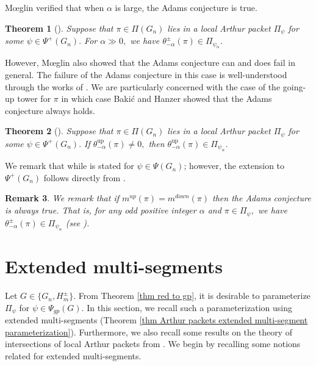 \documentclass[11pt,letterpaper]{amsart}
\newcommand{\up}{{\mathrm{up}}}
\newtheorem{thm}{Theorem}[section]
\newtheorem{rmk}[thm]{Remark}
\numberwithin{equation}{section}
\begin{document}
M{\oe}glin verified that when $\alpha$ is large, the Adams conjecture is true.
\begin{thm}[{\cite[Theorem 6.1]{Moe11c}}]\label{thm Moeglin Adams}
Suppose that $\pi\in\Pi(G_n)$ lies in a local Arthur packet $\Pi_\psi$ for some $\psi\in\Psi^+(G_n).$
    For $\alpha\gg 0,$ we have $\theta_{-\alpha}^\pm(\pi)\in\Pi_{\psi_\alpha}$.
\end{thm}
However, M{\oe}glin also showed that the Adams conjecture can and does fail in general. The failure of the Adams conjecture in this case is well-understood through the works of \cite{BH22, Haz24}. We are particularly concerned with the case of the going-up tower for $\pi$ in which case Baki{\' c} and Hanzer showed that the Adams conjecture always holds.
\begin{thm}[{\cite[Theorem 2]{BH22}}]\label{thm Adams going up tower}
Suppose that $\pi\in\Pi(G_n)$ lies in a local Arthur packet $\Pi_\psi$ for some $\psi\in\Psi^+(G_n).$
    If $\theta_{-\alpha}^{\up}(\pi)\neq 0,$ then $\theta_{-\alpha}^{\up}(\pi)\in\Pi_{\psi_\alpha}$.
\end{thm}
We remark that while \cite[Theorem 2]{BH22} is stated for $\psi\in\Psi(G_n)$; however, the extension to $\Psi^+(G_n)$ follows directly from \cite[Lemma 2.33]{Haz24}.

\begin{rmk}\label{rmk equal first occurences}
    We remark that if $m^{up}(\pi)=m^{down}(\pi)$ then the Adams conjecture is always true. That is, for any odd positive integer $\alpha$ and $\pi\in\Pi_\psi,$ we have $\theta_{-\alpha}^\pm(\pi)\in\Pi_{\psi_\alpha}$ (see \cite[p. 15]{BH22}).
\end{rmk}






\section{Extended multi-segments}\label{sec extended multi-segments}

Let $G\in\{G_n, H_m^\pm\}.$
From Theorem \ref{thm red to gp}, it is desirable to parameterize $\Pi_\psi$ for $\psi\in\Psi_{gp}(G).$ In this section, we recall such a parameterization using extended multi-segments (Theorem \ref{thm Arthur packets extended multi-segment parameterization}). Furthermore, we also recall some results on the theory of intersections of local Arthur packets from \cite{HLL22, HLL25}. We begin by recalling some notions related for extended multi-segments.
\end{document}
